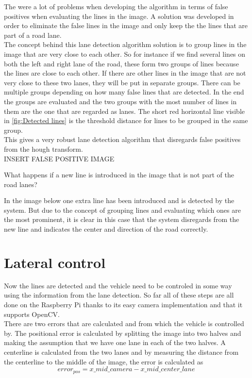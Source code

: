 The were a lot of problems when developing the algorithm in terms of false positives when evaluating the lines in the image. A solution was developed in order to eliminate the false lines in the image and only keep the the lines that are part of a road lane.\\

The concept behind this lane detection algorithm solution is to group lines in the image that are very close to each other. So for instance if we find several lines on both the left and right lane of the road, these form two groups of lines because the lines are close to each other. If there are other lines in the image that are not very close to these two lanes, they will be put in separate groups. There can be multiple groups depending on how many false lines that are detected. In the end the groups are evaluated and the two groups with the most number of lines in them are the one that are regarded as lanes. The short red horizontal line visible in \ref{fig:Detected lines} is the threshold distance for lines to be grouped in the same group.\\

This gives a very robust lane detection algorithm that disregards false positives from the hough transform.\\

INSERT FALSE POSITIVE IMAGE

What happens if a new line is introduced in the image that is not part of the road lanes?

In the image below one extra line has been introduced and is detected by the system. But due to the concept of grouping lines and evaluating which ones are the most prominent, it is clear in this case that the system disregards from the new line and indicates the center and direction of the road correctly. 




\section{Lateral control}
Now the lines are detected and the vehicle need to be controled in some way using the information from the lane detection. So far all of these steps are all done on the Raspberry Pi thanks to its easy camera implementation and that it supports OpenCV.\\

There are two errors that are calculated and from which the vehicle is controlled by. The positional error is calculated by splitting the image into two halves and making the assumption that we have one lane in each of the two halves. A centerline is calculated from the two lanes and by measuring the distance from the centerline to the middle of the image, the error is calculated as $$error_{pos} = x\_mid\_camera - x\_mid\_center\_lane$$

